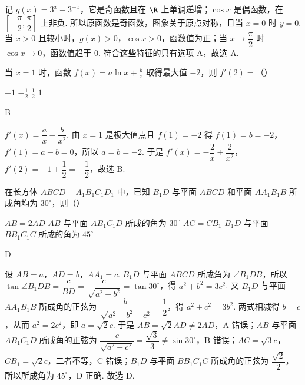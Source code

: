 \begin{solution}
记 \(g(x)=3^x-3^{-x}\)，它是奇函数且在 \(\R\) 上单调递增；\(\cos x\) 是偶函数，在 \(\left[-\dfrac{\pi}{2},\dfrac{\pi}{2}\right]\) 上非负. 所以原函数是奇函数，图象关于原点对称，且当 \(x=0\) 时 \(y=0\). 当 \(x>0\) 且较小时，\(g(x)>0\)，\(\cos x>0\)，函数值为正；当 \(x\to\dfrac{\pi}{2}\) 时 \(\cos x\to0\)，函数值趋于 \(0\). 符合这些特征的只有选项 A，故选 A.
\end{solution}

\begin{problem}
当 \(x=1\) 时，函数 \(f(x)=a\ln x+\frac b x\) 取得最大值 \(-2\)，则 \(f'(2)=\)（\quad）

\choices
    {\(-1\)}
    {\(-\frac12\)}
    {\(\frac12\)}
    {\(1\)}
\end{problem}

\begin{answer}
B
\end{answer}

\begin{solution}
\(f'(x)=\dfrac ax-\dfrac b{x^2}\). 由 \(x=1\) 是极大值点且 \(f(1)=-2\) 得 \(f(1)=b=-2\)，\(f'(1)=a-b=0\)，所以 \(a=b=-2\). 于是 \(f'(x)=-\dfrac2x+\dfrac2{x^2}\)，\(f'(2)=-1+\dfrac12=-\dfrac12\)，故选 B.
\end{solution}

\begin{problem}
在长方体 \(ABCD-A_1B_1C_1D_1\) 中，已知 \(B_1D\) 与平面 \(ABCD\) 和平面 \(AA_1B_1B\) 所成角均为 \(30^\circ\)，则（\quad）

\choices
    {\(AB=2AD\)}
    {\(AB\) 与平面 \(AB_1C_1D\) 所成的角为 \(30^\circ\)}
    {\(AC=CB_1\)}
    {\(B_1D\) 与平面 \(BB_1C_1C\) 所成的角为 \(45^\circ\)}
\end{problem}

\begin{answer}
D
\end{answer}

\begin{solution}
设 \(AB=a\)，\(AD=b\)，\(AA_1=c\). \(B_1D\) 与平面 \(ABCD\) 所成角为 \(\angle B_1DB\)，所以 \(\tan\angle B_1DB=\dfrac{c}{BD}=\dfrac{c}{\sqrt{a^2+b^2}}=\tan30^\circ\)，得 \(a^2+b^2=3c^2\). 又 \(B_1D\) 与平面 \(AA_1B_1B\) 所成角的正弦为 \(\dfrac{b}{\sqrt{a^2+b^2+c^2}}=\dfrac12\)，得 \(a^2+c^2=3b^2\). 两式相减得 \(b=c\)，从而 \(a^2=2c^2\)，即 \(a=\sqrt2c\). 于是 \(AB=\sqrt2AD\ne2AD\)，A 错误；\(AB\) 与平面 \(AB_1C_1D\) 所成角的正弦为 \(\dfrac{c}{\sqrt{a^2+c^2}}=\dfrac{\sqrt3}3\ne\sin30^\circ\)，B 错误；\(AC=\sqrt3c\)，\(CB_1=\sqrt2c\)，二者不等，C 错误；\(B_1D\) 与平面 \(BB_1C_1C\) 所成角的正弦为 \(\dfrac{\sqrt2}2\)，所以所成角为 \(45^\circ\)，D 正确. 故选 D.
\end{solution}

